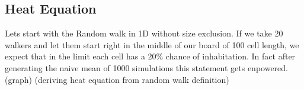 \subsection{Heat Equation}
Lets start with the Random walk in 1D without size exclusion.
If we take 20 walkers and let them start right in the middle of our board of 100 cell length,
we expect that in the limit each cell has a 20\% chance of inhabitation. 
In fact after generating the naive mean of 1000 simulations this statement gets enpowered. 
(graph)
(deriving heat equation from random walk definition)
